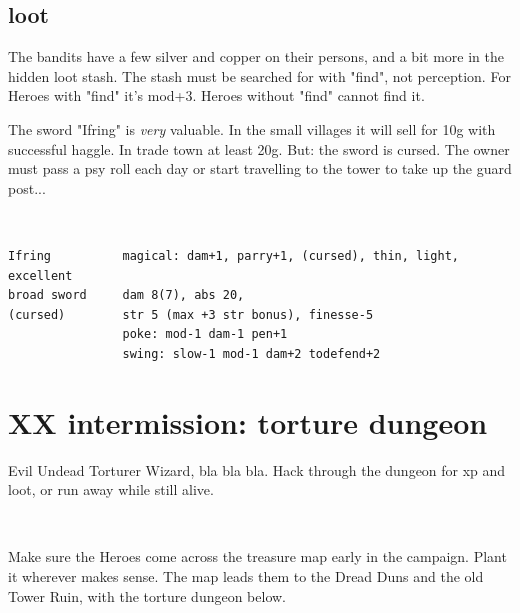 \subsection*{loot}

The bandits have a few silver and copper on their persons, and a bit more in the hidden loot stash. The stash must be searched for with "find", not perception. For Heroes with "find" it's mod+3. Heroes without "find" cannot find it.

The sword "Ifring" is \emph{very} valuable. In the small villages it will sell for 10g with successful haggle. In trade town at least 20g. But: the sword is cursed. The owner must pass a psy roll each day or start travelling to the tower to take up the guard post...

\

\goodbreak 
\small \begin{samepage} \begin{verbatim}
Ifring          magical: dam+1, parry+1, (cursed), thin, light, excellent
broad sword     dam 8(7), abs 20,
(cursed)        str 5 (max +3 str bonus), finesse-5
                poke: mod-1 dam-1 pen+1
                swing: slow-1 mod-1 dam+2 todefend+2
\end{verbatim} \end{samepage} \normalsize









\clearpage
\section*{XX intermission: torture dungeon}
\label{xxtorturedungeon}

Evil Undead Torturer Wizard, bla bla bla. Hack through the dungeon for xp and loot, or run away while still alive.

\

Make sure the Heroes come across the treasure map early in the campaign. Plant it wherever makes sense. The map leads them to the Dread Duns and the old Tower Ruin, with the torture dungeon below.


